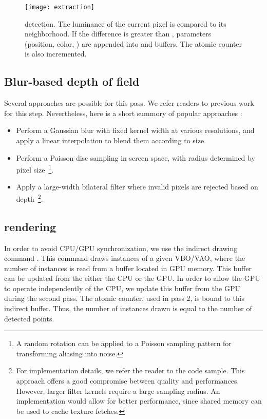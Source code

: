 	\begin{figure}[htb]\centering
	\texttt{[image: extraction]}
	\caption{\Bokeh detection. The luminance of the current pixel is compared to its neighborhood. If the difference is greater than , \bokeh parameters (position, color, \coc) are appended into  and  buffers. The atomic counter  is also incremented.}
	\label{DeRousiers:detection}
	\end{figure}

\subsection{Blur-based depth of field}
Several approaches are possible for this pass. We refer readers to previous work for this step. Nevertheless, here is a short summory of popular approaches :
\begin{itemize}
	\item Perform a Gaussian blur with fixed kernel width at various resolutions, and apply a linear interpolation to blend them according to \coc size.
	\item Perform a Poisson disc sampling in screen space, with radius determined by pixel \coc size~\footnote{A random rotation can be applied to a Poisson sampling pattern for transforming aliasing into noise.}.
	\item Apply a large-width bilateral filter where invalid pixels are rejected based on depth~\footnote{For implementation details, we refer the reader to the code sample. This approach offers a good compromise between quality and performances. However, larger filter kernels require a large sampling radius. An \opencl implementation would allow for better performance, since shared memory can be used to cache texture fetches.}.
\end{itemize}


\subsection{\Bokeh rendering}
In order to avoid CPU/GPU synchronization, we use the indirect drawing command . This command draws instances of a given VBO/VAO, where the number of instances is read from a buffer located in GPU memory. This buffer can be updated from the either the CPU or the GPU. In order to allow the GPU to operate independently of the CPU, we update this buffer from the GPU during the second pass. The atomic counter, used in pass 2, is bound to this indirect buffer. Thus, the number of instances drawn is equal to the number of detected \bokeh points.

